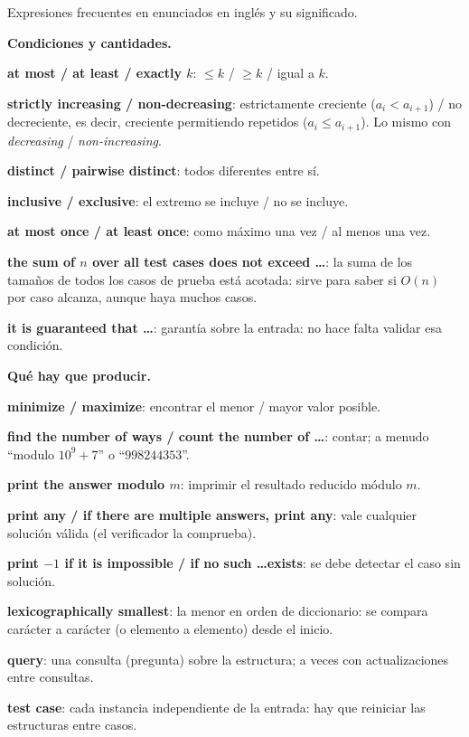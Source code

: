 Expresiones frecuentes en enunciados en inglés y su significado.

\textbf{Condiciones y cantidades.}
\begin{props}
  \item \textbf{at most / at least / exactly \(k\)}: \(\le k\) / \(\ge k\) / igual a \(k\).
  \item \textbf{strictly increasing / non-decreasing}: estrictamente creciente (\(a_i < a_{i+1}\)) / no decreciente, es decir, creciente permitiendo repetidos (\(a_i \le a_{i+1}\)). Lo mismo con \textit{decreasing} / \textit{non-increasing}.
  \item \textbf{distinct / pairwise distinct}: todos diferentes entre sí.
  \item \textbf{inclusive / exclusive}: el extremo se incluye / no se incluye.
  \item \textbf{at most once / at least once}: como máximo una vez / al menos una vez.
  \item \textbf{the sum of \(n\) over all test cases does not exceed \dots}: la suma de los tamaños de todos los casos de prueba está acotada: sirve para saber si \(O(n)\) por caso alcanza, aunque haya muchos casos.
  \item \textbf{it is guaranteed that \dots}: garantía sobre la entrada: no hace falta validar esa condición.
\end{props}

\textbf{Qué hay que producir.}
\begin{props}
  \item \textbf{minimize / maximize}: encontrar el menor / mayor valor posible.
  \item \textbf{find the number of ways / count the number of \dots}: contar; a menudo ``modulo \(10^9+7\)'' o ``\(998244353\)''.
  \item \textbf{print the answer modulo \(m\)}: imprimir el resultado reducido módulo \(m\).
  \item \textbf{print any / if there are multiple answers, print any}: vale cualquier solución válida (el verificador la comprueba).
  \item \textbf{print \(-1\) if it is impossible / if no such \dots exists}: se debe detectar el caso sin solución.
  \item \textbf{lexicographically smallest}: la menor en orden de diccionario: se compara carácter a carácter (o elemento a elemento) desde el inicio.
  \item \textbf{query}: una consulta (pregunta) sobre la estructura; a veces con actualizaciones entre consultas.
  \item \textbf{test case}: cada instancia independiente de la entrada: hay que reiniciar las estructuras entre casos.
\end{props}

